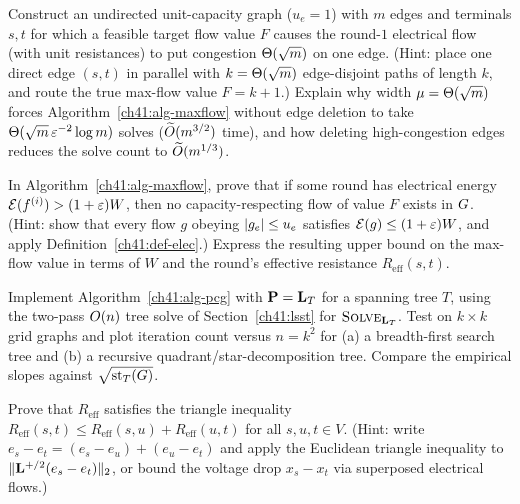 \begin{exercise}\label{ch41:ex-width}
Construct an undirected unit-capacity graph ($u_e = 1$) with $m$ edges and terminals $s,t$ for which a feasible target flow value $F$ causes the round-$1$ electrical flow (with unit resistances) to put congestion $\Theta(\sqrt{m})$ on one edge. (Hint: place one direct edge $(s,t)$ in parallel with $k = \Theta(\sqrt{m})$ edge-disjoint paths of length $k$, and route the true max-flow value $F = k+1$.) Explain why width $\mu = \Theta(\sqrt{m})$ forces Algorithm~\ref{ch41:alg-maxflow} without edge deletion to take $\Theta(\sqrt{m}\,\varepsilon^{-2}\log m)$ solves ($\widetilde{O}(m^{3/2})$ time), and how deleting high-congestion edges reduces the solve count to $\widetilde{O}(m^{1/3})$.
\end{exercise}

\begin{exercise}
In Algorithm~\ref{ch41:alg-maxflow}, prove that if some round has electrical energy $\mathcal{E}(f^{(i)})>(1+\varepsilon)W$, then no capacity-respecting flow of value $F$ exists in $G$. (Hint: show that every flow $g$ obeying $\lvert g_e\rvert \le u_e$ satisfies $\mathcal{E}(g)\le (1+\varepsilon)W$, and apply Definition~\ref{ch41:def-elec}.) Express the resulting upper bound on the max-flow value in terms of $W$ and the round's effective resistance $R_{\mathrm{eff}}(s,t)$.
\end{exercise}

\begin{exercise}
Implement Algorithm~\ref{ch41:alg-pcg} with $\mathbf{P}=\mathbf{L}_T$ for a spanning tree $T$, using the two-pass $O(n)$ tree solve of Section~\ref{ch41:lsst} for $\textsc{Solve}_{\mathbf{L}_T}$. Test on $k\times k$ grid graphs and plot iteration count versus $n = k^2$ for (a) a breadth-first search tree and (b) a recursive quadrant/star-decomposition tree. Compare the empirical slopes against $\sqrt{\operatorname{st}_T(G)}$.
\end{exercise}

\begin{exercise}
Prove that $R_{\mathrm{eff}}$ satisfies the triangle inequality $R_{\mathrm{eff}}(s,t)\le R_{\mathrm{eff}}(s,u)+R_{\mathrm{eff}}(u,t)$ for all $s,u,t \in V$. (Hint: write $e_s - e_t = (e_s - e_u) + (e_u - e_t)$ and apply the Euclidean triangle inequality to $\lVert\mathbf{L}^{+/2}(e_s - e_t)\rVert_2$, or bound the voltage drop $x_s - x_t$ via superposed electrical flows.)
\end{exercise}

